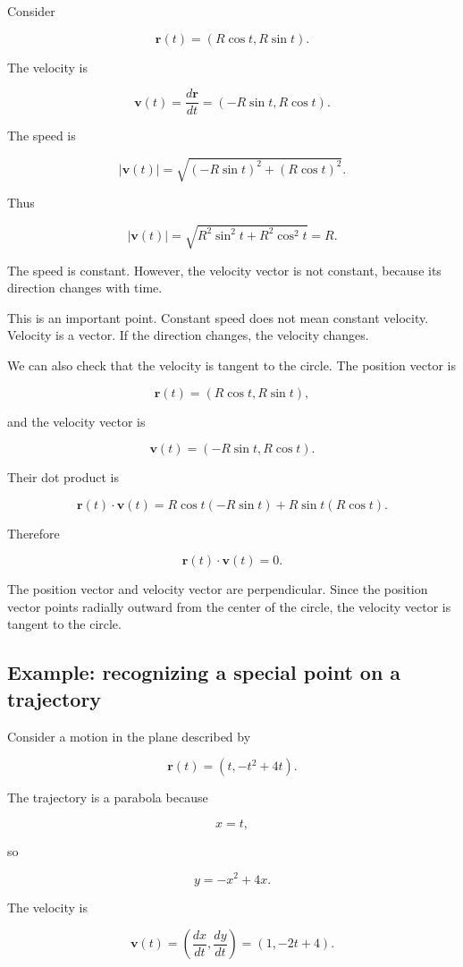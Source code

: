 Consider

\[
\mathbf{r}(t)=(R\cos t,R\sin t).
\]

The velocity is

\[
\mathbf{v}(t)
=
\frac{d\mathbf{r}}{dt}
=
(-R\sin t,R\cos t).
\]

The speed is

\[
|\mathbf{v}(t)|
=
\sqrt{(-R\sin t)^2+(R\cos t)^2}.
\]

Thus

\[
|\mathbf{v}(t)|
=
\sqrt{R^2\sin^2 t+R^2\cos^2 t}
=
R.
\]

The speed is constant. However, the velocity vector is not constant, because its direction changes with time.

This is an important point. Constant speed does not mean constant velocity. Velocity is a vector. If the direction changes, the velocity changes.

We can also check that the velocity is tangent to the circle. The position vector is

\[
\mathbf{r}(t)=(R\cos t,R\sin t),
\]

and the velocity vector is

\[
\mathbf{v}(t)=(-R\sin t,R\cos t).
\]

Their dot product is

\[
\mathbf{r}(t)\cdot\mathbf{v}(t)
=
R\cos t(-R\sin t)+R\sin t(R\cos t).
\]

Therefore

\[
\mathbf{r}(t)\cdot\mathbf{v}(t)=0.
\]

The position vector and velocity vector are perpendicular. Since the position vector points radially outward from the center of the circle, the velocity vector is tangent to the circle.

\subsection{Example: recognizing a special point on a trajectory}

Consider a motion in the plane described by

\[
\mathbf{r}(t)=(t, -t^2+4t).
\]

The trajectory is a parabola because

\[
x=t,
\]

so

\[
y=-x^2+4x.
\]

The velocity is

\[
\mathbf{v}(t)=
\left(
\frac{dx}{dt},
\frac{dy}{dt}
\right)
=
(1,-2t+4).
\]

